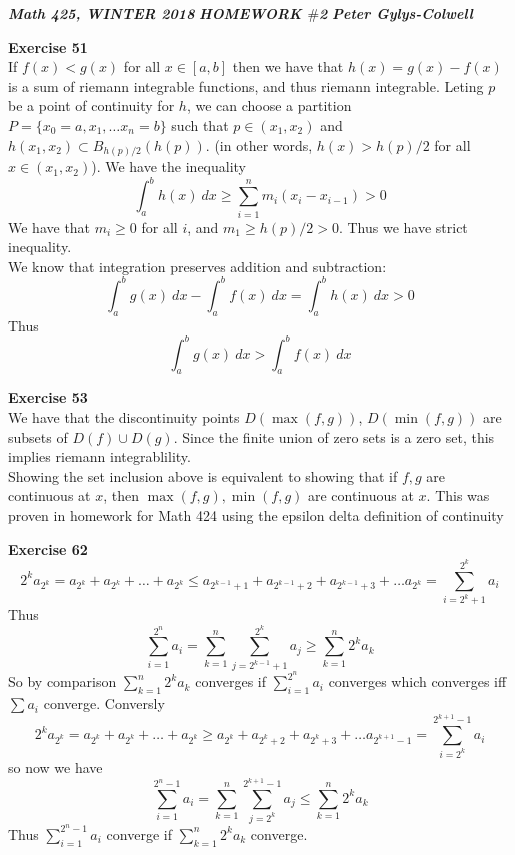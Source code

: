 \documentclass[12pt]{article}
\newenvironment{ques}[1]{\textbf{Exercise #1}\vspace{1 mm}\\ }{\bigskip}
\theoremstyle{definition}
\begin{document}
\noindent \textit{\textbf{Math 425, WINTER 2018}} \hspace{1.3cm}
\textit{\textbf{HOMEWORK $\#$2}} \hspace{1.3cm} \textit{\textbf{Peter
Gylys-Colwell}} 

\vspace{1cm}

\begin{ques}{51}
	If $f(x) < g(x)$ for all $x \in [a,b]$ then we have that $h(x) = g(x) -
	f(x)$ is a sum of riemann integrable functions, and thus riemann
	integrable. Leting $p$ be a point of continuity for $h$, we can choose a
	partition $P= \{x_0 = a, x_1, \dots x_n = b\}$ such that $p \in (x_1,x_2)$
	and $h(x_1,x_2) \subset B_{h(p)/2}(h(p))$. (in other words, $h(x) > h(p)/2$
	for all $x \in (x_1,x_2)$). We have the inequality
	$$\int_a^b h(x) \ dx \geq \sum_{i=1}^n m_i(x_i - x_{i-1}) > 0$$
	We have that $m_i \geq 0$ for all $i$, and $m_1 \geq h(p)/2 > 0$. Thus we
	have strict inequality.\\
	We know that integration preserves addition and subtraction:
	$$\int_a^b g(x) \ dx - \int_a^b f(x) \ dx = \int_a^b h(x) \ dx > 0$$
	Thus
	$$\int_a^b g(x) \ dx > \int_a^b f(x) \ dx$$
\end{ques}

\begin{ques}{53}
	We have that the discontinuity points $D(\max(f,g))$, $D(\min(f,g))$ are
	subsets of $D(f) \cup D(g)$. Since the finite union of zero sets is a zero
	set, this implies riemann integrablility.\\
	Showing the set inclusion above is equivalent to showing that if $f,g$ are
	continuous at $x$, then $\max(f,g), \min(f,g)$ are continuous at $x$. This
	was proven in homework for Math 424 using the epsilon delta definition of
	continuity
\end{ques}

\begin{ques}{62}
	$$2^ka_{2^k} = a_{2^k}+ a_{2^k}+ \dots + a_{2^k} \leq a_{2^{k-1}+1} +
	a_{2^{k-1}+2} + a_{2^{k-1}+3} + \dots a_{2^k} = \sum_{i=2^k+1}^{2^k} a_i$$
	Thus 
	$$\sum_{i=1}^{2^n} a_i = \sum_{k=1}^n\sum_{j=2^{k-1} + 1}^{2^k}a_j \geq
	\sum_{k = 1}^n 2^ka_k$$
	So by comparison $\sum_{k = 1}^n 2^ka_k$ converges if $\sum_{i=1}^{2^n}
	a_i$ converges which converges iff $\sum a_i$ converge. Conversly
	$$2^ka_{2^k} = a_{2^k}+ a_{2^k}+ \dots + a_{2^k} \geq a_{2^{k}} +
	a_{2^{k}+2} + a_{2^{k}+3} + \dots a_{2^{k + 1} - 1} =
	\sum_{i=2^k}^{2^{k+1}-1} a_i$$
	so now we have
	$$\sum_{i=1}^{2^n - 1} a_i = \sum_{k=1}^n\sum_{j=2^{k}}^{2^{k+1}-1}a_j \leq
	\sum_{k = 1}^n 2^ka_k$$
	Thus $\sum_{i=1}^{2^n - 1} a_i$ converge if $\sum_{k = 1}^n 2^ka_k$
	converge.
\end{ques}
\end{document}
